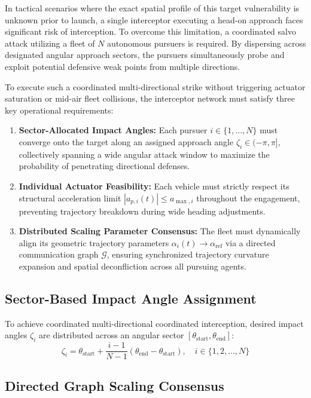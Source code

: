 In tactical scenarios where the exact spatial profile of this target vulnerability is unknown prior to launch, a single interceptor executing a head-on approach faces significant risk of interception. To overcome this limitation, a coordinated salvo attack utilizing a fleet of $N$ autonomous pursuers is required. By dispersing across designated angular approach sectors, the pursuers simultaneously probe and exploit potential defensive weak points from multiple directions. 

To execute such a coordinated multi-directional strike without triggering actuator saturation or mid-air fleet collisions, the interceptor network must satisfy three key operational requirements:
\begin{enumerate}
    \item \textbf{Sector-Allocated Impact Angles:} Each pursuer $i \in \{1, \dots, N\}$ must converge onto the target along an assigned approach angle $\zeta_i \in (-\pi, \pi]$, collectively spanning a wide angular attack window to maximize the probability of penetrating directional defenses.
    \item \textbf{Individual Actuator Feasibility:} Each vehicle must strictly respect its structural acceleration limit $|a_{p,i}(t)| \le a_{\max,i}$ throughout the engagement, preventing trajectory breakdown during wide heading adjustments.
    \item \textbf{Distributed Scaling Parameter Consensus:} The fleet must dynamically align its geometric trajectory parameters $\alpha_i(t) \to \alpha_{\text{ref}}$ via a directed communication graph $\mathcal{G}$, ensuring synchronized trajectory curvature expansion and spatial deconfliction across all pursuing agents.
\end{enumerate}
\subsection{Sector-Based Impact Angle Assignment}
To achieve coordinated multi-directional coordinated interception, desired impact angles $\zeta_i$ are distributed across an angular sector $[\theta_{\text{start}}, \theta_{\text{end}}]$:
\begin{equation}\label{eq:ch_sp_sector_assignment}
	\zeta_i = \theta_{\text{start}} + \frac{i-1}{N-1} (\theta_{\text{end}} - \theta_{\text{start}}), \quad i \in \{1, 2, \dots, N\}
\end{equation}
\subsection{Directed Graph Scaling Consensus}

